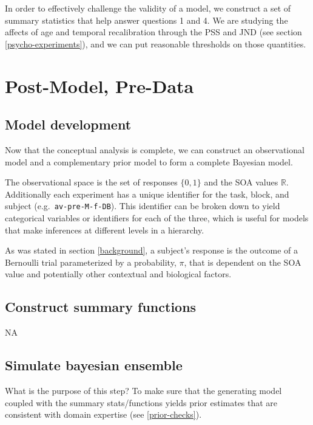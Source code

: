 \documentclass[11pt, oneside]{book}
\begin{document}
In order to effectively challenge the validity of a model, we construct a set of summary statistics that help answer questions 1 and 4. We are studying the affects of age and temporal recalibration through the PSS and JND (see section \ref{psycho-experiments}), and we can put reasonable thresholds on those quantities.

\hypertarget{post-model-pre-data}{%
\section{Post-Model, Pre-Data}\label{post-model-pre-data}}

\hypertarget{model-development}{%
\subsection{Model development}\label{model-development}}

Now that the conceptual analysis is complete, we can construct an observational model and a complementary prior model to form a complete Bayesian model.

The observational space is the set of responses \(\lbrace 0, 1\rbrace\) and the SOA values \(\mathbb{R}\). Additionally each experiment has a unique identifier for the task, block, and subject (e.g.~\texttt{av-pre-M-f-DB}). This identifier can be broken down to yield categorical variables or identifiers for each of the three, which is useful for models that make inferences at different levels in a hierarchy.

As was stated in section \ref{background}, a subject's response is the outcome of a Bernoulli trial parameterized by a probability, \(\pi\), that is dependent on the SOA value and potentially other contextual and biological factors.

\hypertarget{construct-summary-functions}{%
\subsection{Construct summary functions}\label{construct-summary-functions}}

NA

\hypertarget{simulate-bayesian-ensemble}{%
\subsection{Simulate bayesian ensemble}\label{simulate-bayesian-ensemble}}

What is the purpose of this step? To make sure that the generating model coupled with the summary stats/functions yields prior estimates that are consistent with domain expertise (see \ref{prior-checks}).
\end{document}
